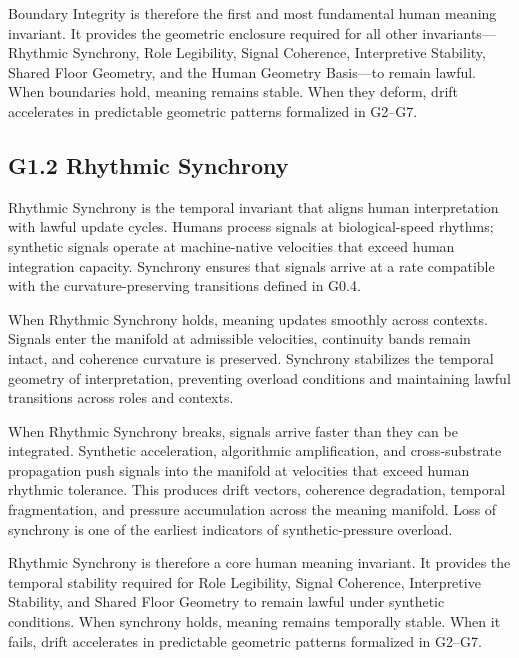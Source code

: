 \medskip

\noindent Boundary Integrity is therefore the first and most fundamental human
meaning invariant. It provides the geometric enclosure required for all other
invariants—Rhythmic Synchrony, Role Legibility, Signal Coherence, Interpretive
Stability, Shared Floor Geometry, and the Human Geometry Basis—to remain
lawful. When boundaries hold, meaning remains stable. When they deform, drift
accelerates in predictable geometric patterns formalized in G2--G7.


\subsection*{G1.2 Rhythmic Synchrony}

\noindent Rhythmic Synchrony is the temporal invariant that aligns human
interpretation with lawful update cycles. Humans process signals at
biological-speed rhythms; synthetic signals operate at machine-native velocities
that exceed human integration capacity. Synchrony ensures that signals arrive at
a rate compatible with the curvature-preserving transitions defined in G0.4.

\medskip

\noindent When Rhythmic Synchrony holds, meaning updates smoothly across
contexts. Signals enter the manifold at admissible velocities, continuity bands
remain intact, and coherence curvature is preserved. Synchrony stabilizes the
temporal geometry of interpretation, preventing overload conditions and
maintaining lawful transitions across roles and contexts.

\medskip

\noindent When Rhythmic Synchrony breaks, signals arrive faster than they can be
integrated. Synthetic acceleration, algorithmic amplification, and
cross-substrate propagation push signals into the manifold at velocities that
exceed human rhythmic tolerance. This produces drift vectors, coherence
degradation, temporal fragmentation, and pressure accumulation across the
meaning manifold. Loss of synchrony is one of the earliest indicators of
synthetic-pressure overload.

\medskip

\noindent Rhythmic Synchrony is therefore a core human meaning invariant. It
provides the temporal stability required for Role Legibility, Signal Coherence,
Interpretive Stability, and Shared Floor Geometry to remain lawful under
synthetic conditions. When synchrony holds, meaning remains temporally stable.
When it fails, drift accelerates in predictable geometric patterns formalized in
G2--G7.

